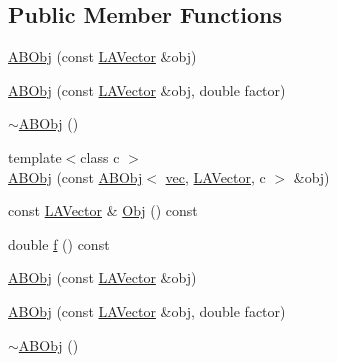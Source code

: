\subsection*{Public Member Functions}
\begin{DoxyCompactItemize}
\item 
\mbox{\hyperlink{classROOT_1_1Minuit2_1_1ABObj_3_01vec_00_01LAVector_00_01double_01_4_a3b8232d5f2becc9d30bcbc5ad933e41a}{A\+B\+Obj}} (const \mbox{\hyperlink{classROOT_1_1Minuit2_1_1LAVector}{L\+A\+Vector}} \&obj)
\item 
\mbox{\hyperlink{classROOT_1_1Minuit2_1_1ABObj_3_01vec_00_01LAVector_00_01double_01_4_a809b8940cc6667e7171d180577cea95d}{A\+B\+Obj}} (const \mbox{\hyperlink{classROOT_1_1Minuit2_1_1LAVector}{L\+A\+Vector}} \&obj, double factor)
\item 
\mbox{\hyperlink{classROOT_1_1Minuit2_1_1ABObj_3_01vec_00_01LAVector_00_01double_01_4_a31143ce46d8714d3a4a136ec265dc98d}{$\sim$\+A\+B\+Obj}} ()
\item 
{\footnotesize template$<$class c $>$ }\\\mbox{\hyperlink{classROOT_1_1Minuit2_1_1ABObj_3_01vec_00_01LAVector_00_01double_01_4_aeb6018846b4e8252a64eb21db982fe96}{A\+B\+Obj}} (const \mbox{\hyperlink{classROOT_1_1Minuit2_1_1ABObj}{A\+B\+Obj}}$<$ \mbox{\hyperlink{classROOT_1_1Minuit2_1_1vec}{vec}}, \mbox{\hyperlink{classROOT_1_1Minuit2_1_1LAVector}{L\+A\+Vector}}, c $>$ \&obj)
\item 
const \mbox{\hyperlink{classROOT_1_1Minuit2_1_1LAVector}{L\+A\+Vector}} \& \mbox{\hyperlink{classROOT_1_1Minuit2_1_1ABObj_3_01vec_00_01LAVector_00_01double_01_4_a8c53d63141dbfd9b90f73290b895d87a}{Obj}} () const
\item 
double \mbox{\hyperlink{classROOT_1_1Minuit2_1_1ABObj_3_01vec_00_01LAVector_00_01double_01_4_a418f4c2409e7afb1804e3033a7aed2fd}{f}} () const
\item 
\mbox{\hyperlink{classROOT_1_1Minuit2_1_1ABObj_3_01vec_00_01LAVector_00_01double_01_4_a3b8232d5f2becc9d30bcbc5ad933e41a}{A\+B\+Obj}} (const \mbox{\hyperlink{classROOT_1_1Minuit2_1_1LAVector}{L\+A\+Vector}} \&obj)
\item 
\mbox{\hyperlink{classROOT_1_1Minuit2_1_1ABObj_3_01vec_00_01LAVector_00_01double_01_4_a809b8940cc6667e7171d180577cea95d}{A\+B\+Obj}} (const \mbox{\hyperlink{classROOT_1_1Minuit2_1_1LAVector}{L\+A\+Vector}} \&obj, double factor)
\item 
\mbox{\hyperlink{classROOT_1_1Minuit2_1_1ABObj_3_01vec_00_01LAVector_00_01double_01_4_a31143ce46d8714d3a4a136ec265dc98d}{$\sim$\+A\+B\+Obj}} ()

\end{DoxyCompactItemize}
